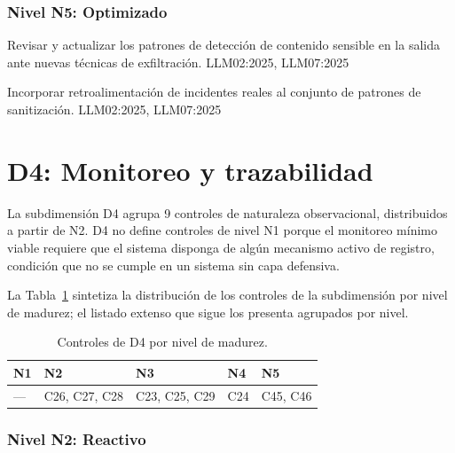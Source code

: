 \subsubsection*{Nivel N5: Optimizado}

  {Revisar y actualizar los patrones de detección de contenido sensible en la salida ante nuevas técnicas de exfiltración.}
  {LLM02:2025, LLM07:2025}

  {Incorporar retroalimentación de incidentes reales al conjunto de patrones de sanitización.}
  {LLM02:2025, LLM07:2025}

\section{D4: Monitoreo y trazabilidad}
\label{sec:controles-d4}

La subdimensión D4 agrupa 9 controles de naturaleza observacional, distribuidos a partir de N2. D4 no define controles de nivel N1 porque el monitoreo mínimo viable requiere que el sistema disponga de algún mecanismo activo de registro, condición que no se cumple en un sistema sin capa defensiva.

La Tabla~\ref{tab:niveles-d4} sintetiza la distribución de los controles de la subdimensión por nivel de madurez; el listado extenso que sigue los presenta agrupados por nivel.

\begin{table}[H]
  \centering
  \caption{Controles de D4 por nivel de madurez.}
  \label{tab:niveles-d4}
  \begin{tabularx}{\textwidth}{@{} >{\raggedright\arraybackslash}X >{\raggedright\arraybackslash}X >{\raggedright\arraybackslash}X >{\raggedright\arraybackslash}X >{\raggedright\arraybackslash}X @{}}
    \toprule
    \cellcolor{level-n1!15}\textbf{N1} & \cellcolor{level-n2!15}\textbf{N2} & \cellcolor{level-n3!15}\textbf{N3} & \cellcolor{level-n4!15}\textbf{N4} & \cellcolor{level-n5!15}\textbf{N5} \\
    \midrule
    --- & C26, C27, C28 & C23, C25, C29 & C24 & C45, C46 \\
    \bottomrule
  \end{tabularx}
\end{table}

\subsubsection*{Nivel N2: Reactivo}

